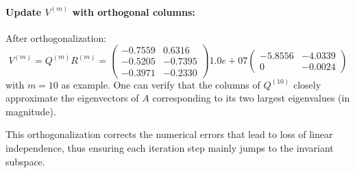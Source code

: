 \documentclass[12pt]{article}
\begin{document}
\paragraph{Update $V^{(m)}$ with orthogonal columns:} 

After orthogonalization:
$$
V^{(m)}=Q^{(m)} R^{(m)} =\begin{pmatrix}
-0.7559 & 0.6316 \\
-0.5205 & -0.7395 \\
-0.3971 & -0.2330
\end{pmatrix} 1.0e+07 \begin{pmatrix}
-5.8556 & -4.0339 \\
0 & -0.0024
\end{pmatrix}
$$
with $m = 10$ as example. One can verify that the columns of $Q^{(10)}$ closely approximate the eigenvectors of $A$ corresponding to its two largest eigenvalues (in magnitude).

This orthogonalization corrects the numerical errors that lead to loss of linear independence, thus ensuring each iteration step mainly jumps to the invariant subspace.

\end{document}
